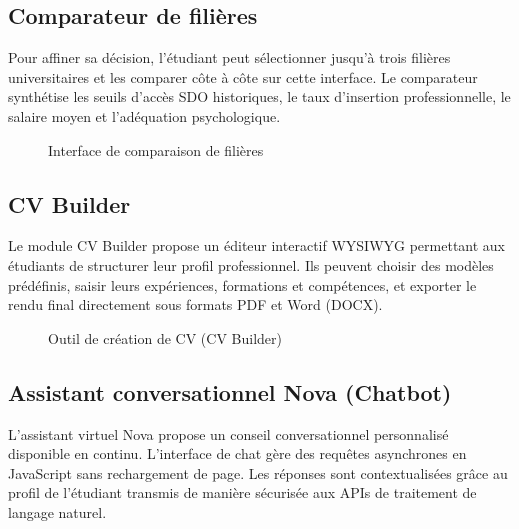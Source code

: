 \subsection{Comparateur de filières}

Pour affiner sa décision, l'étudiant peut sélectionner jusqu'à trois filières universitaires et les comparer côte à côte sur cette interface. Le comparateur synthétise les seuils d'accès SDO historiques, le taux d'insertion professionnelle, le salaire moyen et l'adéquation psychologique.

\begin{figure}[H]
    \centering
    \caption{Interface de comparaison de filières}
    \label{fig:interface_comparateur}
\end{figure}

\subsection{CV Builder}

Le module CV Builder propose un éditeur interactif WYSIWYG permettant aux étudiants de structurer leur profil professionnel. Ils peuvent choisir des modèles prédéfinis, saisir leurs expériences, formations et compétences, et exporter le rendu final directement sous formats PDF et Word (DOCX).

\begin{figure}[H]
    \centering
    \caption{Outil de création de CV (CV Builder)}
    \label{fig:interface_cv_builder}
\end{figure}

\subsection{Assistant conversationnel Nova (Chatbot)}

L'assistant virtuel Nova propose un conseil conversationnel personnalisé disponible en continu. L'interface de chat gère des requêtes asynchrones en JavaScript sans rechargement de page. Les réponses sont contextualisées grâce au profil de l'étudiant transmis de manière sécurisée aux APIs de traitement de langage naturel.

